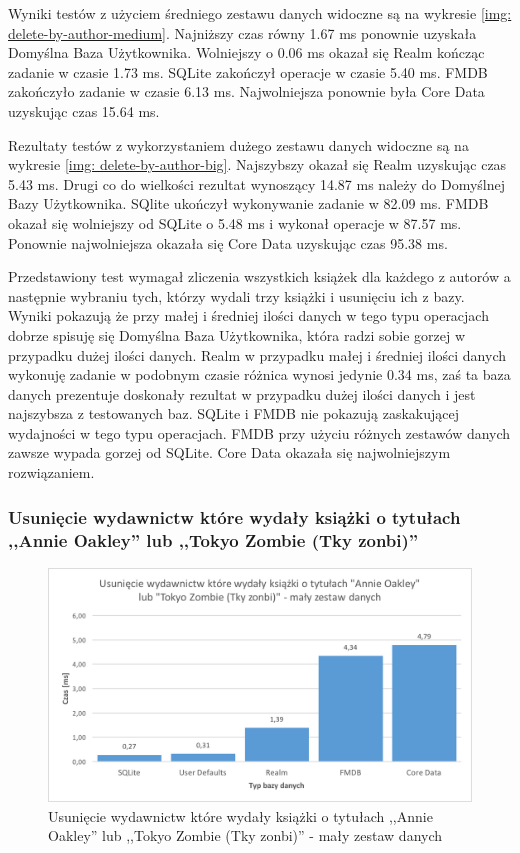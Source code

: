 Wyniki testów z użyciem średniego zestawu danych widoczne są na wykresie \ref{img: delete-by-author-medium}. Najniższy czas równy 1.67 ms ponownie uzyskała Domyślna Baza Użytkownika. Wolniejszy o 0.06 ms okazał się Realm kończąc zadanie w czasie 1.73 ms. SQLite zakończył operacje w czasie 5.40 ms. FMDB zakończyło zadanie w czasie 6.13 ms. Najwolniejsza ponownie była Core Data uzyskując czas 15.64 ms.

Rezultaty testów z wykorzystaniem dużego zestawu danych widoczne są na wykresie \ref{img: delete-by-author-big}. Najszybszy okazał się Realm uzyskując czas 5.43 ms. Drugi co do wielkości rezultat wynoszący 14.87 ms należy do Domyślnej Bazy Użytkownika. SQlite ukończył wykonywanie zadanie w 82.09 ms. FMDB okazał się wolniejszy od SQLite o 5.48 ms i wykonał operacje w 87.57 ms. Ponownie najwolniejsza okazała się Core Data uzyskując czas 95.38 ms.

Przedstawiony test wymagał zliczenia wszystkich książek dla każdego z autorów a następnie wybraniu tych, którzy wydali trzy książki i usunięciu ich z bazy. Wyniki pokazują że przy małej i średniej ilości danych w tego typu operacjach dobrze spisuję się Domyślna Baza Użytkownika, która radzi sobie gorzej w przypadku dużej ilości danych. Realm w przypadku małej i średniej ilości danych wykonuję zadanie w podobnym czasie różnica wynosi jedynie 0.34 ms, zaś ta baza danych prezentuje doskonały rezultat w przypadku dużej ilości danych i jest najszybsza z testowanych baz. SQLite i FMDB nie pokazują zaskakującej wydajności w tego typu operacjach. FMDB przy użyciu różnych zestawów danych zawsze wypada gorzej od SQLite. Core Data okazała się najwolniejszym rozwiązaniem.

\subsubsection{Usunięcie wydawnictw które wydały książki o tytułach ,,Annie Oakley'' lub ,,Tokyo Zombie (Tky zonbi)''}

\begin{figure}[H]
    \centering\includegraphics[width=\linewidth]{img/delete_data/delete_by_publisher/delete_by_publisher_small_test.png}
    \caption{Usunięcie wydawnictw które wydały książki o tytułach ,,Annie Oakley'' lub ,,Tokyo Zombie (Tky zonbi)'' - mały zestaw danych}
    \label{img: delete-by-publisher-small}
\end{figure}

